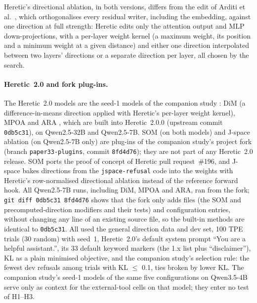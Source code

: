 Heretic's directional ablation, in both versions, differs from the edit of Arditi et al.\ \cite{arditi2024refusal},
which orthogonalises every residual writer, including the embedding, against one direction at full strength: Heretic
edits only the attention output and MLP down-projections, with a per-layer weight kernel (a maximum weight, its
position and a minimum weight at a given distance) and either one direction interpolated between two layers'
directions or a separate direction per layer, all chosen by the search.

\paragraph{Heretic~2.0 and fork plug-ins.} The Heretic~2.0 models are the seed-1 models of the companion study
\cite{young2026harder}: DiM (a difference-in-means direction \cite{arditi2024refusal} applied with Heretic's
per-layer weight kernel), MPOA \cite{lai2024projected,lai2025mpoa} and ARA
\cite{weidmann2026ara}, which are built into Heretic~2.0.0 (upstream commit \texttt{0db5c31}), on Qwen2.5-32B and
Qwen2.5-7B. SOM \cite{piras2025som} (on both models) and J-space ablation \cite{sekinal2026jspace} (on Qwen2.5-7B
only) are plug-ins of the companion study's project fork (branch \texttt{paper33-plugins}, commit \texttt{8fd4d76});
they are not part of any Heretic~2.0 release. SOM ports the proof of concept of Heretic pull request~\#196, and
J-space bakes directions from the \texttt{jspace-refusal} code into the weights with Heretic's row-normalised
directional ablation instead of the reference forward hook. All Qwen2.5-7B runs, including DiM, MPOA and ARA, ran
from the fork; \texttt{git diff 0db5c31 8fd4d76} shows that the fork only adds files (the SOM and
precomputed-direction modifiers and their tests) and configuration entries, without changing any line of an existing
source file, so the built-in methods are identical to \texttt{0db5c31}. All used the general direction data
and dev set, 100 TPE trials (30 random) with seed~1, Heretic~2.0's default system prompt ``You are a helpful
assistant.'', its 33 default keyword markers (the 1.x list plus ``disclaimer''), KL as a plain minimised objective,
and the companion study's selection rule: the fewest dev refusals among trials with KL $\le$ 0.1, ties broken by
lower KL. The companion study's seed-1 models of the same five configurations on Qwen3.5-4B serve only as context
for the external-tool cells on that model; they enter no test of H1--H3.

